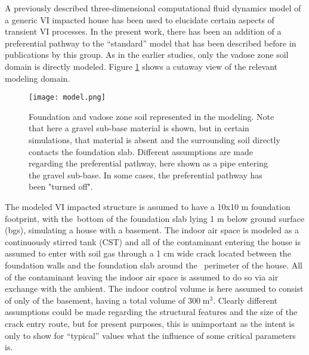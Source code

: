 A previously described three-dimensional computational fluid dynamics model of a generic VI impacted house has been used to elucidate certain aspects of transient VI processes.
In the present work, there has been an addition of a preferential pathway to the “standard” model that has been described before in publications by this group\cite{shen_influence_2013,yao_investigating_2017,yao_three-dimensional_2017}.
As in the earlier studies, only the vadose zone soil domain is directly modeled.
Figure \ref{fig:model} shows a cutaway view of the relevant modeling domain.\par

\begin{figure}[htb!]
  \centering
 \texttt{[image: model.png]}
 \caption{Foundation and vadose zone soil represented in the modeling. Note that here a gravel sub-base material is shown, but in certain simulations, that material is absent and the surrounding soil directly contacts the foundation slab.  Different assumptions are made regarding the preferential pathway, here shown as a pipe entering the gravel sub-base. In some cases, the preferential pathway has been "turned off".}\label{fig:model}
\end{figure}

The modeled VI impacted structure is assumed to have a 10x10 m foundation footprint, with the bottom of the foundation slab lying 1 m below ground surface (bgs), simulating a house with a basement.
The indoor air space is modeled as a continuously stirred tank (CST)\cite{u.s._environmental_protection_agency_oswer_2015} and all of the contaminant entering the house is assumed to enter with soil gas through a 1 cm wide crack located between the foundation walls and the foundation slab around the  perimeter of the house.
All of the contaminant leaving the indoor air space is assumed to do so via air exchange with the ambient.
The indoor control volume is here assumed to consist of only of the basement, having a total volume of $300 \; \mathrm{m^3}$.
Clearly different assumptions could be made regarding the structural features and the size of the crack entry route, but for present purposes, this is unimportant as the intent is only to show for “typical” values what the influence of some critical parameters is.\par

